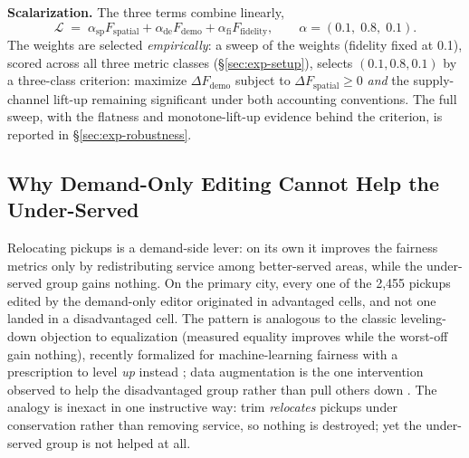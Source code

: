 \textbf{Scalarization.} The three terms combine linearly,
\begin{equation}\label{eq:objective}
\mathcal{L} \;=\; \alpha_{\mathrm{sp}} F_{\mathrm{spatial}}
+ \alpha_{\mathrm{de}} F_{\mathrm{demo}}
+ \alpha_{\mathrm{fi}} F_{\mathrm{fidelity}},
\qquad \alpha = (0.1,\; 0.8,\; 0.1).
\end{equation}
The weights are selected \emph{empirically}: a sweep of the weights
(fidelity fixed at 0.1), scored across all three metric classes
(\S\ref{sec:exp-setup}), selects $(0.1, 0.8, 0.1)$ by a three-class
criterion: maximize $\Delta F_{\mathrm{demo}}$ subject to
$\Delta F_{\mathrm{spatial}} \ge 0$ \emph{and} the supply-channel lift-up
remaining significant under both accounting conventions. The full sweep, with the
flatness and monotone-lift-up evidence behind the criterion, is reported in
\S\ref{sec:exp-robustness}.

\subsection{Why Demand-Only Editing Cannot Help the Under-Served}\label{sec:leveling}

Relocating pickups is a demand-side lever: on its own it improves the fairness
metrics only by redistributing service among better-served areas, while the
under-served group gains nothing. On the primary city, every one of the
2{,}455 pickups edited by the demand-only editor originated in advantaged
cells, and not one landed in a disadvantaged cell.
The pattern is analogous to the classic leveling-down objection to
equalization \cite{parfit1997} (measured equality improves while the
worst-off gain nothing), recently formalized for machine-learning fairness
with a prescription to level \emph{up} instead \cite{mittelstadt2024}; data
augmentation is the one intervention observed to help the disadvantaged group
rather than pull others down \cite{zietlow2022}. The analogy is inexact in one
instructive way: trim \emph{relocates} pickups under conservation rather than
removing service, so nothing is destroyed; yet the under-served group is
not helped at all.

